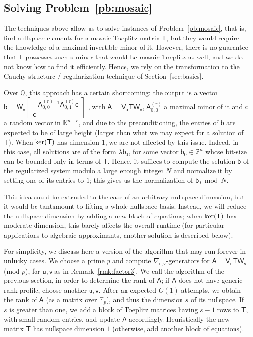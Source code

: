 \documentclass[sigconf]{acmart}
\newcommand{\vb}{\ensuremath{\mathsf{b}}}
\newcommand{\vc}{\ensuremath{\mathsf{c}}}
\newcommand{\vu}{\ensuremath{\mathsf{u}}}
\newcommand{\vv}{\ensuremath{\mathsf{v}}}
\newcommand{\mA}{\ensuremath{\mathsf{A}}}
\newcommand{\mT}{\ensuremath{\mathsf{T}}}
\newcommand{\mV}{\ensuremath{\mathsf{V}}}
\newcommand{\mW}{\ensuremath{\mathsf{W}}}
\newcommand{\K}{\ensuremath{\mathbb{K}}}
\newcommand{\Q}{\ensuremath{\mathbb{Q}}}
\newcommand{\Z}{\ensuremath{\mathbb{Z}}}
\theoremstyle{acmdefinition}
\begin{document}

\vspace{-5px}
\subsection{Solving Problem~\ref{pb:mosaic}}\label{ssec:liftQ}

The techniques above allow us to solve instances of
Problem~\ref{pb:mosaic}, that is, find nullspace elements for a
mosaic Toeplitz matrix $\mT$, but they would require the knowledge of
a maximal invertible minor of it. However, there is no guarantee that
$\mT$ possesses such a minor that would be mosaic Toeplitz as well,
and we do not know how to find it efficiently. Hence, we rely on the
transformation to the Cauchy structure / regularization technique
of Section~\ref{sec:basics}.

Over $\Q$, this approach has a certain shortcoming: the output is a
vector
%
$\vb=\mW_{\vv}
\left[\begin{smallmatrix} 
-\mA^{(r)}_{0,0}{}^{-1} \mA^{(r)}_{0,1} \vc \\ 
\vc
\end{smallmatrix}\right]$
%
, with $\mA=\mV_\vu \mT \mW_{\vv}$, $\mA^{(r)}_{0,0}$ a maximal minor
of it and $\vc$ a random vector in $\K^{n-r}$, and due to the
preconditioning, the entries of $\vb$ are expected to be of large
height (larger than what we may expect for a solution of $\mT$). When
${\rm ker}(\mT)$ has dimension $1$, we are not affected by this
issue. Indeed, in this case, all solutions are of the form
$\lambda \vb_0$, for some vector $\vb_0 \in \Z^n$ whose bit-size can
be bounded only in terms of $\mT$. Hence, it suffices to compute the
solution $\vb$ of the regularized system modulo a large enough integer
$N$ and normalize it by setting one of its entries to $1$; this gives
us the normalization of $\vb_0 \bmod N$.

This idea could be extended to the case of an arbitrary nullspace
dimension, but it would be tantamount to lifting a whole nullspace
basis. Instead, we will reduce the nullspace dimension by adding a new
block of equations; when ${\rm ker}(\mT)$ has moderate dimension, this
barely affects the overall runtime (for particular applications to
algebraic approximants, another solution is described below).

For simplicity, we discuss here a version of the algorithm that may
run forever in unlucky cases. We choose a prime $p$ and compute
$\nabla_{\vu,\vv}$-generators for $\mA = \mV_\vu \mT \mW_{\vv}$ (mod
$p$), for $\vu,\vv$ as in Remark~\ref{rmk:factor3}. We call the
algorithm of the previous section, in order to determine the rank of
$\mA$; if $\mA$ does not have generic rank profile, choose another
$\vu,\vv$. After an expected $O(1)$ attempts, we obtain the rank of
$\mA$ (as a matrix over $\mathbb{F}_p$), and thus the dimension $s$ of
its nullspace. If $s$ is greater than one, we add a block of Toeplitz
matrices having $s-1$ rows to $\mT$, with small random entries, and
update $\mA$ accordingly. Heuristically the new matrix $\mT$ has
nullspace dimension $1$ (otherwise, add another block of equations).
\end{document}
